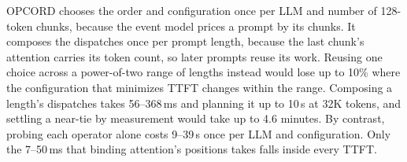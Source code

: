 OPCORD chooses the order and configuration once per LLM and number of 128-token chunks, because the event model prices a prompt by its chunks.
It composes the dispatches once per prompt length, because the last chunk's attention carries its token count, so later prompts reuse its work.
Reusing one choice across a power-of-two range of lengths instead would lose up to 10\% where the configuration that minimizes TTFT changes within the range.
Composing a length's dispatches takes 56--368\,ms and planning it up to 10\,s at 32K tokens, and settling a near-tie by measurement would take up to 4.6 minutes.
By contrast, probing each operator alone costs 9--39\,s once per LLM and configuration.
Only the 7--50\,ms that binding attention's positions takes falls inside every TTFT.
